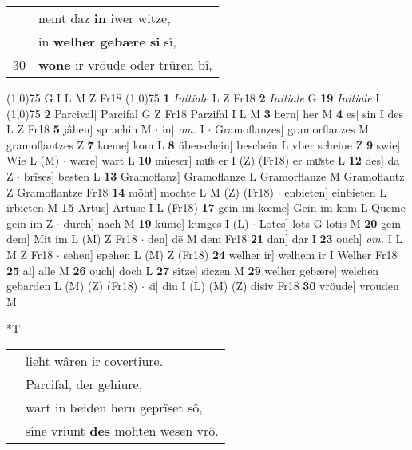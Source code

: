 \documentclass[8pt,a4paper,notitlepage]{article}
\begin{document}
\begin{table}[ht]
\begin{minipage}[t]{0.5\linewidth}
\begin{tabular}{rl}
 & nemt daz \textbf{in} iwer witze,\\ 
 & in \textbf{welher gebære} \textbf{si} sî,\\ 
30 & \textbf{wone} ir vröude oder trûren bî,\\ 
\end{tabular}
\scriptsize
\line(1,0){75} \newline
G I L M Z Fr18 \newline
\line(1,0){75} \newline
\textbf{1} \textit{Initiale} L Z Fr18  \textbf{2} \textit{Initiale} G  \textbf{19} \textit{Initiale} I  \newline
\line(1,0){75} \newline
\textbf{2} Parcival] Parcifal G Z Fr18 Parzifal I L M \textbf{3} hern] her M \textbf{4} es] sin I des L Z Fr18 \textbf{5} jâhen] sprachin M  $\cdot$ in] \textit{om.} I  $\cdot$ Gramoflanzes] gramorflanzes M gramoflantzes Z \textbf{7} kœme] kom L \textbf{8} überschein] beschein L vber scheine Z \textbf{9} swie] Wie L (M)  $\cdot$ wære] wart L \textbf{10} müeser] muͦs er I (Z) (Fr18) er muͯste L \textbf{12} des] da Z  $\cdot$ brîses] besten L \textbf{13} Gramoflanz] Gramoflanze L Gramorflanze M Gramoflantz Z Gramoflantze Fr18 \textbf{14} möht] mochte L M (Z) (Fr18)  $\cdot$ enbieten] einbieten L irbieten M \textbf{15} Artus] Artuse I L (Fr18) \textbf{17} gein im kœme] Gein im kom L Queme gein im Z  $\cdot$ durch] nach M \textbf{19} künic] kunges I (L)  $\cdot$ Lotes] lots G lotis M \textbf{20} gein dem] Mit im L (M) Z Fr18  $\cdot$ den] dē M dem Fr18 \textbf{21} dan] dar I \textbf{23} ouch] \textit{om.} I L M Z Fr18  $\cdot$ sehen] spehen L (M) Z (Fr18) \textbf{24} welher ir] welhem ir I Welher Fr18 \textbf{25} al] alle M \textbf{26} ouch] doch L \textbf{27} sitze] siczen M \textbf{29} welher gebære] welchen gebarden L (M) (Z) (Fr18)  $\cdot$ si] diu I (L) (M) (Z) disiv Fr18 \textbf{30} vröude] vrouden M \newline
\end{minipage}
\hspace{0.5cm}
\begin{minipage}[t]{0.5\linewidth}
\small
\begin{center}*T
\end{center}
\begin{tabular}{rl}
 & lieht wâren ir covertiure.\\ 
 & Parcifal, der gehiure,\\ 
 & wart in beiden hern geprîset sô,\\ 
 & sîne vriunt \textbf{des} mohten wesen vrô.\\ 

\end{tabular}
\end{minipage}
\end{table}
\end{document}
